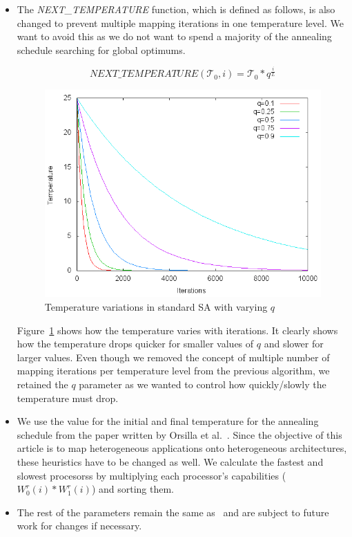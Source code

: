 \begin{itemize}
\item The \textit{NEXT\_TEMPERATURE} function, which is defined as follows, is
also changed to prevent multiple mapping iterations in one temperature level. We
want to avoid this as we do not want to spend a majority of the annealing
schedule searching for global optimums. 

\begin{equation}
  \textit{NEXT\_TEMPERATURE}(\mathcal{T}_0, i) =
  \mathcal{T}_0*q^{\frac{i}{L}}
\end{equation}

\begin{figure}[h!]
  \centering
  \includegraphics[scale=0.35]{./figures/temperature-drop}
  \caption{Temperature variations in standard SA with varying $q$}
  \label{fig:7}
\end{figure}
Figure~\ref{fig:7} shows how the temperature varies with iterations. It
clearly shows how the temperature drops quicker for smaller values of
$q$ and slower for larger values. Even though we removed the concept of
multiple number of mapping iterations per temperature level from the
previous algorithm, we retained the $q$ parameter as we wanted to
control how quickly/slowly the temperature must drop.

\item We use the value for the initial and final temperature for the annealing
schedule from the paper written by Orsilla et al.~\cite{hors06}. Since the
objective of this article is to map heterogeneous applications onto
heterogeneous architectures, these heuristics have to be changed as well. We 
calculate the fastest and slowest procesorss by multiplying each processor's
capabilities ($W^r_0(i) * W^r_1(i)$) and sorting them. 

\item The rest of the parameters remain the same as~\cite{hors06} and are subject to future work
for changes if necessary.

\end{itemize} 


